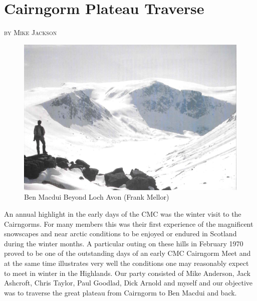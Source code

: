 \documentclass[a5paper,openany,font 10pt]{scrbook}
\makeatletter
\newcommand{\chapterauthor}[1]{%
{\parindent0pt\vspace*{-5pt}%
\linespread{1.1}\large\scshape#1%
\par\nobreak\vspace*{35pt}}
\@afterheading%
}
\makeatother
\begin{document}
\chapter{Cairngorm Plateau Traverse}
\label{sec:orged356d4}
\chapterauthor{by Mike Jackson}

\begin{figure}[htb]
\centering
\includegraphics[width=.9\linewidth]{./images/Ben_Macdui.jpg}
\caption{\label{fig:org4d39097}
Ben Macdui Beyond Loch Avon (Frank Mellor)}
\end{figure}

An annual highlight in the early days of the CMC was the
winter visit to the Cairngorms. For many members this was their
first experience of the magnificent snowscapes and near arctic
conditions to be enjoyed  or endured  in Scotland during the
winter months. A particular outing on these hills in February
1970 proved to be one  of the outstanding days of an early CMC
Cairngorm Meet and at the same time illustrates very well the
conditions one may reasonably expect to meet in winter in the
Highlands. Our party consisted of Mike Anderson, Jack Ashcroft,
Chris Taylor, Paul Goodlad, Dick Arnold and myself and our
objective was to traverse the great plateau from Cairngorm to Ben
Macdui and back.
\end{document}

